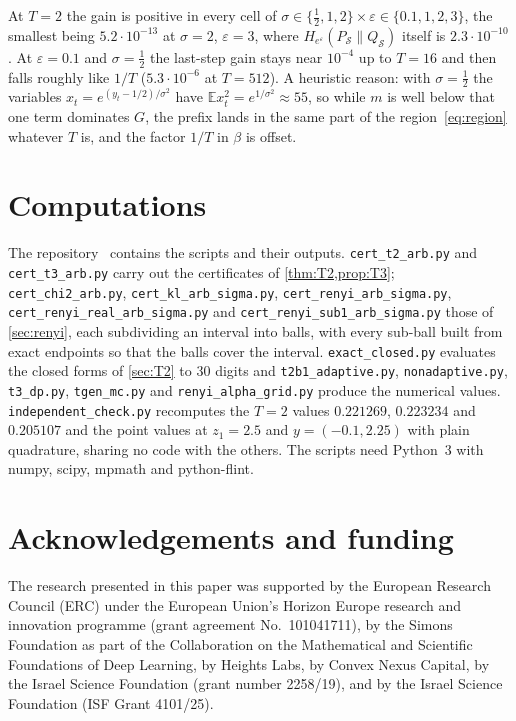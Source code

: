 \documentclass[11pt]{amsart}
\theoremstyle{definition}
\theoremstyle{remark}
\newcommand{\E}{\mathbb E}
\newcommand{\He}{H_{e^{\varepsilon}}}
\begin{document}
At $T=2$ the gain is positive in every cell of $\sigma\in\{\frac12,1,2\}\times\varepsilon\in\{0.1,1,2,3\}$, the smallest being $5.2\cdot10^{-13}$ at $\sigma=2$, $\varepsilon=3$, where $\He(P_{\mathcal S}\|Q_{\mathcal S})$ itself is $2.3\cdot10^{-10}$. At $\varepsilon=0.1$ and $\sigma=\frac12$ the last-step gain stays near $10^{-4}$ up to $T=16$ and then falls roughly like $1/T$ ($5.3\cdot10^{-6}$ at $T=512$). A heuristic reason: with $\sigma=\frac12$ the variables $x_t=e^{(y_t-1/2)/\sigma^2}$ have $\E x_t^2=e^{1/\sigma^2}\approx55$, so while $m$ is well below that one term dominates $G$, the prefix lands in the same part of the region~\eqref{eq:region} whatever $T$ is, and the factor $1/T$ in $\beta$ is offset.

\section{Computations}\label{sec:checks}

{\sloppy The repository~\cite{code} contains the scripts and their outputs. \texttt{cert\_t2\_arb.py} and \texttt{cert\_t3\_arb.py} carry out the certificates of \cref{thm:T2,prop:T3}; \texttt{cert\_chi2\_arb.py}, \texttt{cert\_kl\_arb\_sigma.py}, \texttt{cert\_renyi\_arb\_sigma.py}, \texttt{cert\_renyi\_real\_arb\_sigma.py} and \texttt{cert\_renyi\_sub1\_arb\_sigma.py} those of \cref{sec:renyi}, each subdividing an interval into balls, with every sub-ball built from exact endpoints so that the balls cover the interval. \texttt{exact\_closed.py} evaluates the closed forms of \cref{sec:T2} to $30$ digits and \texttt{t2b1\_adaptive.py}, \texttt{nonadaptive.py}, \texttt{t3\_dp.py}, \texttt{tgen\_mc.py} and \texttt{renyi\_alpha\_grid.py} produce the numerical values. \texttt{independent\_check.py} recomputes the $T=2$ values $0.221269$, $0.223234$ and $0.205107$ and the point values at $z_1=2.5$ and $y=(-0.1,2.25)$ with plain quadrature, sharing no code with the others. The scripts need Python~3 with numpy, scipy, mpmath and python-flint.\par}

\section*{Acknowledgements and funding}
The research presented in this paper was supported by the European Research
Council (ERC) under the European Union's Horizon Europe research and
innovation programme (grant agreement No.~101041711), by the Simons
Foundation as part of the Collaboration on the Mathematical and Scientific
Foundations of Deep Learning, by Heights Labs, by Convex Nexus Capital, by
the Israel Science Foundation (grant number 2258/19), and by the Israel
Science Foundation (ISF Grant 4101/25).
\end{document}
